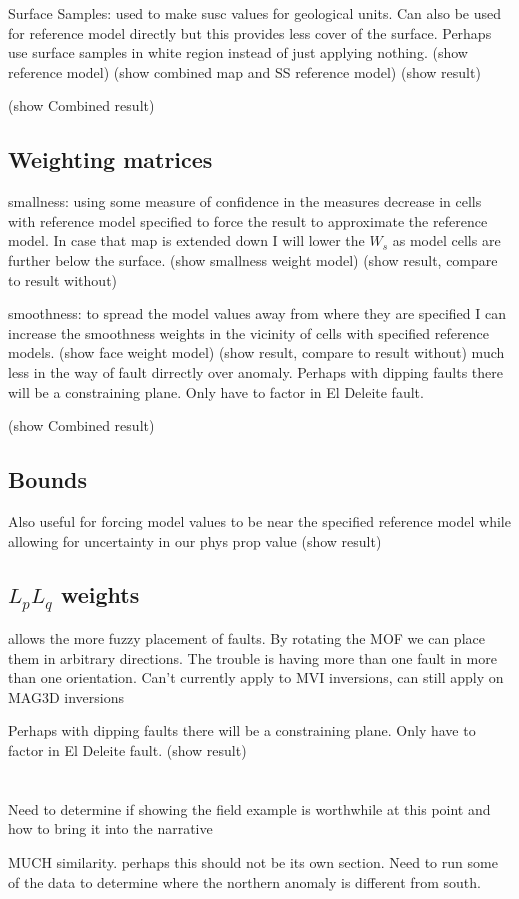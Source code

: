 Surface Samples: used to make susc values for geological units. Can also be used for reference model directly but this provides less cover of the surface. Perhaps use surface samples in white region instead of just applying nothing.
(show reference model)
(show combined map and SS reference model)
(show result)

(show Combined result)

\subsection{Weighting matrices}
\label{sec:Weighting matrices:ElPoma2}

smallness: using some measure of confidence in the measures decrease in cells with reference model specified to force the result to approximate the reference model. In case that map is extended down I will lower the $W_s$ as model cells are further below the surface.
(show smallness weight model)
(show result, compare to result without)


smoothness: to spread the model values away from where they are specified I can increase the smoothness weights in the vicinity of cells with specified reference models. 
(show face weight model)
(show result, compare to result without)
much less in the way of fault dirrectly over anomaly. Perhaps with dipping faults there will be a constraining plane. Only have to factor in El Deleite fault.

(show Combined result)
\subsection{Bounds}
\label{sec:Bounds:ElPoma2}

Also useful for forcing model values to be near the specified reference model while allowing for uncertainty in our phys prop value
(show result)

\subsection{$L_p L_q$ weights}
\label{sec:Lp Lq weights:ElPoma2}

allows the more fuzzy placement of faults. By rotating the \ac{MOF} we can place them in arbitrary directions. The trouble is having more than one fault in more than one orientation. Can't currently apply to MVI inversions, can still apply on MAG3D inversions 

Perhaps with dipping faults there will be a constraining plane. Only have to factor in El Deleite fault.
(show result)
\\\\\\
Need to determine if showing the field example is worthwhile at this point and how to bring it into the narrative

MUCH similarity. perhaps this should not be its own section. Need to run some of the data to determine where the northern anomaly is different from south.

\endinput

Any text after an \endinput is ignored.
You could put scraps here or things in progress.

